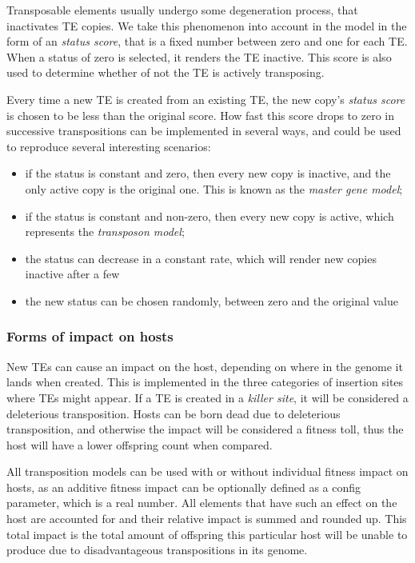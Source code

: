 \documentclass[10pt]{article}
\begin{document}
Transposable elements usually undergo some degeneration process, that
inactivates TE copies. We take this phenomenon into account in the
model in the form of an \emph{status score}, that is a fixed number
between zero and one for each TE. When a status of zero is selected,
it renders the TE inactive. This score is also used to determine
whether of not the TE is actively transposing.

Every time a new TE is created from an existing TE, the new copy's
\emph{status score} is chosen to be less than the original score. How
fast this score drops to zero in successive transpositions can be
implemented in several ways, and could be used to reproduce several
interesting scenarios:

\begin{itemize}
\item if the status is constant and zero, then every new copy is
  inactive, and the only active copy is the original one. This is
  known as the \emph{master gene model};

\item if the status is constant and non-zero, then every new copy is
  active, which represents the \emph{transposon model};

\item the status can decrease in a constant rate, which will render
  new copies inactive after a few 

\item the new status can be chosen randomly, between zero and the
  original value
\end{itemize}

\subsubsection{Forms of impact on hosts}

New TEs can cause an impact on the host, depending on where in the
genome it lands when created. This is implemented in the three
categories of insertion sites where TEs might appear. If a TE is
created in a \emph{killer site}, it will be considered a deleterious
transposition. Hosts can be born dead due to deleterious
transposition, and otherwise the impact will be considered a fitness
toll, thus the host will have a lower offspring count when compared.

All transposition models can be used with or without individual
fitness impact on hosts, as an additive fitness impact can be
optionally defined as a config parameter, which is a real number. All
elements that have such an effect on the host are accounted for and
their relative impact is summed and rounded up. This total impact is
the total amount of offspring this particular host will be unable to
produce due to disadvantageous transpositions in its genome.
\end{document}
